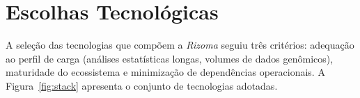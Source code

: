 
\section{Escolhas Tecnológicas}
\label{sec:stack}

A seleção das tecnologias que compõem a \textit{Rizoma} seguiu
três critérios: adequação ao perfil de carga (análises estatísticas
longas, volumes de dados genômicos), maturidade do ecossistema e
minimização de dependências operacionais. A
Figura~\ref{fig:stack} apresenta o conjunto de tecnologias adotadas.

